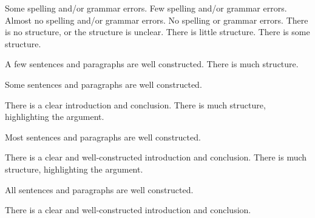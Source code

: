 \documentclass{../fal_assignment}
\begin{document}
\begin{markingrubric}
        \grade 		Some spelling and/or grammar errors.  
        \grade 		Few spelling and/or grammar errors.
        \grade 		Almost no spelling and/or grammar errors.
        \grade 		No spelling or grammar errors.
%
        \grade\fail 	There is no structure, or the structure is unclear.
        \grade 		There is little structure.
        \grade 		There is some structure.
        \par 		A few sentences and paragraphs are well constructed.
        \grade 		There is much structure.
        \par 		Some sentences and paragraphs are well constructed.
        \par 		There is a clear introduction and conclusion.
        \grade 		There is much structure, highlighting the argument.
        \par 		Most sentences and paragraphs are well constructed.
        \par 		There is a clear and well-constructed introduction and conclusion.
        \grade 		There is much structure, highlighting the argument.
        \par 		All sentences and paragraphs are well constructed.
        \par 		There is a clear and well-constructed introduction and conclusion.
\end{markingrubric}
\end{document}
